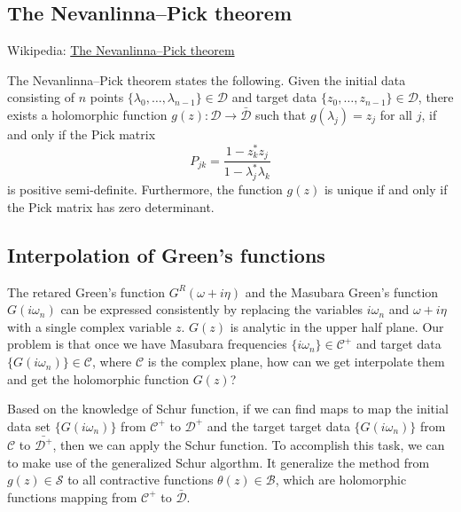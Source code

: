 \documentclass[
	preprint,%
	aps,
	prb,
	showpacs,	
	amsmath, amssymb]{revtex4-2}
\DeclareRobustCommand{\+}{\hstretch{1.25} {\boldsymbol {\mathrel{+}}}}
\newcommand{\C}{ {\mathcal{C}} }
\newcommand{\D}{ {\mathcal{D}} }
\newcommand{\Dbar}{ {\bar{\mathcal{D}}} }
\newcommand{\B}{ {\mathcal{B}} }
\begin{document}
\subsection{The Nevanlinna–Pick theorem}
\label{subsec:pick-theorem}

Wikipedia: 
\href{https://en.wikipedia.org/wiki/Nevanlinna%E2%80%93Pick_interpolation}{The Nevanlinna–Pick theorem}

The Nevanlinna–Pick theorem states the following.
Given the initial data consisting of $n$ points 
$\{\lambda_0, \dots, \lambda_{n-1} \} \in \D$ and target data
$\{z_0, \dots, z_{n-1} \} \in \D$, there exists 
a holomorphic function $g(z): \D \to \Dbar$ 
such that $g(\lambda_j) = z_j$ for all $j$, if and only if 
the Pick matrix
\begin{equation}
	P_{jk} = \frac{1-z_k^* z_j}{1 - \lambda_j^* \lambda_k}
\end{equation}
is positive semi-definite. Furthermore, the function $g(z)$ is 
unique if and only if the Pick matrix has zero determinant.


\subsection{Interpolation of Green's functions}
\label{subsec:interpolation-of-GF}

The retared Green's function $G^R(\omega + i\eta)$ and the Masubara 
Green's function $G(i\omega_n)$ can be expressed consistently by replacing 
the variables $i\omega_n$ and $\omega + i\eta$ with a single complex 
variable $z$. $G(z)$ is analytic in the upper half plane. 
Our problem is that once we have Masubara frequencies $\{i\omega_n\} \in \C^+$ 
and target data $\{ G(i\omega_n)\} \in \C$, where $\C$ is 
the complex plane, how can we get interpolate them and get the 
holomorphic function $G(z)$?

Based on the knowledge of Schur function, if we can find maps 
to map the initial data set $\{ G(i\omega_n)\}$
from $\C^+$ to $\D^+$ and the target 
target data $\{ G(i\omega_n)\}$ from $\C$ to $\bar{\D^+}$, 
then we can apply the Schur function. 
To accomplish this task, we can to make use of the generalized 
Schur algorthm\cite{adamyan2003reconstruction}. It generalize the 
method from $g(z) \in \mathcal{S}$ to all contractive functions 
$\theta(z) \in \B$, which 
are holomorphic functions mapping from $\mathcal{C^+}$ 
to $\Dbar$.	
\end{document}
